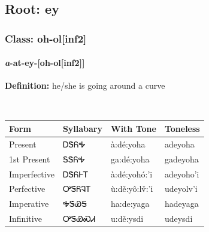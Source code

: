 \needspace{4in}
\subsection*{Root: ey}
\nopagebreak
{}
\needspace{3in}
\subsubsection*{Class: oh-ol[inf2]}
\nopagebreak
\needspace{2in}
\paragraph*{\textit{a}{-}at{-}\textbf{ey}{-}[oh-ol[inf2]]}
\nopagebreak
\textbf{Definition: } he/she is going around a curve
\\[0.5em]
\begin{tabularx}{\textwidth}{l X X X}%
\toprule%
\textbf{Form}&\textbf{Syllabary}&\textbf{With Tone}&\textbf{Toneless}\\%
\midrule%
Present&ᎠᏕᏲᎭ&à:dé:yoha&adeyoha\\%
1st Present&ᎦᏕᏲᎭ&ga:dé:yoha&gadeyoha\\%
Imperfective&ᎠᏕᏲᎰᎢ&à:dé:yohó:’i&adeyoho’i\\%
Perfective&ᎤᏕᏲᎸᎢ&ù:dě:yô:lv̌:’i&udeyolv’i\\%
Imperative&ᎭᏕᏯᎦ&ha:de:yaga&hadeyaga\\%
Infinitive&ᎤᏕᏯᏍᏗ&u:dě:ysdi&udeysdi\\%
\bottomrule%
\end{tabularx}
\\[1em]